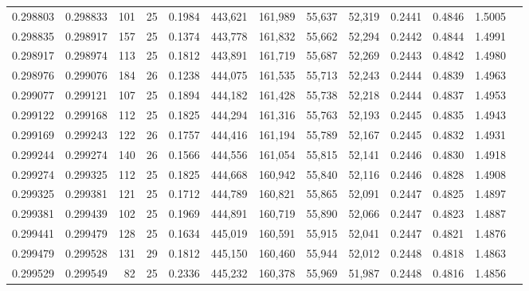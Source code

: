 \begin{tabular}{rrrrrrrrrrrrr}
0.298803 & 0.298833 &   101 &  25 &                                     0.1984 & 443,621 & 161,989 &  55,637 &  52,319 & 0.2441 & 0.4846 & 1.5005 \\
0.298835 & 0.298917 &   157 &  25 &                                     0.1374 & 443,778 & 161,832 &  55,662 &  52,294 & 0.2442 & 0.4844 & 1.4991 \\
0.298917 & 0.298974 &   113 &  25 &                                     0.1812 & 443,891 & 161,719 &  55,687 &  52,269 & 0.2443 & 0.4842 & 1.4980 \\
0.298976 & 0.299076 &   184 &  26 &                                     0.1238 & 444,075 & 161,535 &  55,713 &  52,243 & 0.2444 & 0.4839 & 1.4963 \\
0.299077 & 0.299121 &   107 &  25 &                                     0.1894 & 444,182 & 161,428 &  55,738 &  52,218 & 0.2444 & 0.4837 & 1.4953 \\
0.299122 & 0.299168 &   112 &  25 &                                     0.1825 & 444,294 & 161,316 &  55,763 &  52,193 & 0.2445 & 0.4835 & 1.4943 \\
0.299169 & 0.299243 &   122 &  26 &                                     0.1757 & 444,416 & 161,194 &  55,789 &  52,167 & 0.2445 & 0.4832 & 1.4931 \\
0.299244 & 0.299274 &   140 &  26 &                                     0.1566 & 444,556 & 161,054 &  55,815 &  52,141 & 0.2446 & 0.4830 & 1.4918 \\
0.299274 & 0.299325 &   112 &  25 &                                     0.1825 & 444,668 & 160,942 &  55,840 &  52,116 & 0.2446 & 0.4828 & 1.4908 \\
0.299325 & 0.299381 &   121 &  25 &                                     0.1712 & 444,789 & 160,821 &  55,865 &  52,091 & 0.2447 & 0.4825 & 1.4897 \\
0.299381 & 0.299439 &   102 &  25 &                                     0.1969 & 444,891 & 160,719 &  55,890 &  52,066 & 0.2447 & 0.4823 & 1.4887 \\
0.299441 & 0.299479 &   128 &  25 &                                     0.1634 & 445,019 & 160,591 &  55,915 &  52,041 & 0.2447 & 0.4821 & 1.4876 \\
0.299479 & 0.299528 &   131 &  29 &                                     0.1812 & 445,150 & 160,460 &  55,944 &  52,012 & 0.2448 & 0.4818 & 1.4863 \\
0.299529 & 0.299549 &    82 &  25 &                                     0.2336 & 445,232 & 160,378 &  55,969 &  51,987 & 0.2448 & 0.4816 & 1.4856 \\

\end{tabular}
